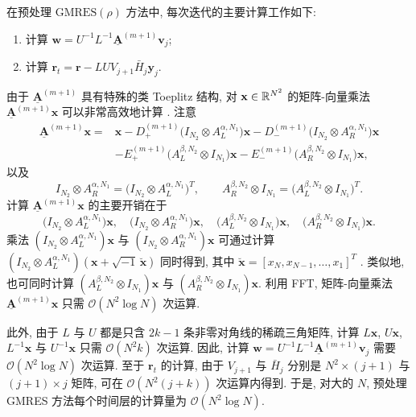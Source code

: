 在预处理 $\mathrm{GMRES}(\rho)$ 方法中, 每次迭代的主要计算工作如下:
\begin{enumerate}
  \item[(1)] 计算 $\mathbf{w}=U^{-1}L^{-1}\underline{\mathbf{A}}^{(m+1)}\mathbf{v}_{j}$;
  \item[(2)] 计算 $\mathbf{r}_{t}=\mathbf{r}-LUV_{j+1}\bar{H}_{j}\mathbf{y}_{j}$.
\end{enumerate}

由于 $\underline{\mathbf{A}}^{(m+1)}$ 具有特殊的类 Toeplitz 结构, 对 $\mathbf{x}\in\mathbb{R}^{N^{2}}$ 的矩阵-向量乘法 $\underline{\mathbf{A}}^{(m+1)}\mathbf{x}$ 可以非常高效地计算 \cite{src:16,src:43}. 注意
\[
\begin{array}{rl}
  \underline{\mathbf{A}}^{(m+1)}\mathbf{x}
  = & \mathbf{x}-D_{+}^{(m+1)}\bigl(I_{N_{2}}\otimes A_{L}^{\alpha,N_{1}}\bigr)\mathbf{x}
    -D_{-}^{(m+1)}\bigl(I_{N_{2}}\otimes A_{R}^{\alpha,N_{1}}\bigr)\mathbf{x}\\[1.5mm]
  & -E_{+}^{(m+1)}\bigl(A_{L}^{\beta,N_{2}}\otimes I_{N_{1}}\bigr)\mathbf{x}
    -E_{-}^{(m+1)}\bigl(A_{R}^{\beta,N_{2}}\otimes I_{N_{1}}\bigr)\mathbf{x},
\end{array}
\]
以及
\[
  I_{N_{2}}\otimes A_{R}^{\alpha,N_{1}}=\bigl(I_{N_{2}}\otimes A_{L}^{\alpha,N_{1}}\bigr)^{T},\qquad
  A_{R}^{\beta,N_{2}}\otimes I_{N_{1}}=\bigl(A_{L}^{\beta,N_{2}}\otimes I_{N_{1}}\bigr)^{T}.
\]
计算 $\underline{\mathbf{A}}^{(m+1)}\mathbf{x}$ 的主要开销在于
\[
  \bigl(I_{N_{2}}\otimes A_{L}^{\alpha,N_{1}}\bigr)\mathbf{x},\quad
  \bigl(I_{N_{2}}\otimes A_{R}^{\alpha,N_{1}}\bigr)\mathbf{x},\quad
  \bigl(A_{L}^{\beta,N_{2}}\otimes I_{N_{1}}\bigr)\mathbf{x},\quad
  \bigl(A_{R}^{\beta,N_{2}}\otimes I_{N_{1}}\bigr)\mathbf{x}.
\]
乘法 $(I_{N_{2}}\otimes A_{L}^{\alpha,N_{1}})\mathbf{x}$ 与 $(I_{N_{2}}\otimes A_{R}^{\alpha,N_{1}})\mathbf{x}$ 可通过计算 $(I_{N_{2}}\otimes A_{L}^{\alpha,N_{1}})(\mathbf{x}+\sqrt{-1}\,\breve{\mathbf{x}})$ 同时得到, 其中 $\breve{\mathbf{x}}=[x_{N},x_{N-1},\ldots,x_{1}]^{T}$ \cite{src:66}. 类似地, 也可同时计算 $(A_{L}^{\beta,N_{2}}\otimes I_{N_{1}})\mathbf{x}$ 与 $(A_{R}^{\beta,N_{2}}\otimes I_{N_{1}})\mathbf{x}$. 利用 FFT, 矩阵-向量乘法 $\underline{\mathbf{A}}^{(m+1)}\mathbf{x}$ 只需 $\mathcal{O}(N^{2}\log N)$ 次运算.

此外, 由于 $L$ 与 $U$ 都是只含 $2k-1$ 条非零对角线的稀疏三角矩阵, 计算 $L\mathbf{x}$, $U\mathbf{x}$, $L^{-1}\mathbf{x}$ 与 $U^{-1}\mathbf{x}$ 只需 $\mathcal{O}(N^{2}k)$ 次运算. 因此, 计算 $\mathbf{w}=U^{-1}L^{-1}\underline{\mathbf{A}}^{(m+1)}\mathbf{v}_{j}$ 需要 $\mathcal{O}(N^{2}\log N)$ 次运算. 至于 $\mathbf{r}_{t}$ 的计算, 由于 $V_{j+1}$ 与 $\bar{H}_{j}$ 分别是 $N^{2}\times(j+1)$ 与 $(j+1)\times j$ 矩阵, 可在 $\mathcal{O}(N^{2}(j+k))$ 次运算内得到. 于是, 对大的 $N$, 预处理 GMRES 方法每个时间层的计算量为 $\mathcal{O}(N^{2}\log N)$.

